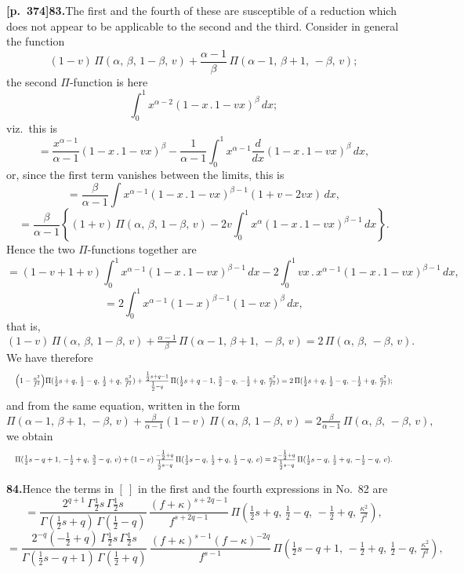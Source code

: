 \documentclass[11pt]{article}
\begin{document}
\bigskip

\noindent\textbf{[p.~374]}\quad \textbf{83.}\quad The first and the fourth of these are susceptible of a reduction which does not appear to be applicable to the second and the third. Consider in general the function
\[
(1-v)\,\Pi(\alpha,\,\beta,\,1-\beta,\,v) + \frac{\alpha-1}{\beta}\,\Pi(\alpha-1,\,\beta+1,\,-\beta,\,v);
\]
the second $\Pi$-function is here
\[
\int_{0}^{1} x^{\alpha-2}(1-x\,.\,1-vx)^{\beta}\,dx;
\]
viz.\ this is
\[
= \frac{x^{\alpha-1}}{\alpha-1}(1-x\,.\,1-vx)^{\beta} - \frac{1}{\alpha-1}\int_{0}^{1} x^{\alpha-1}\frac{d}{dx}(1-x\,.\,1-vx)^{\beta}\,dx,
\]
or, since the first term vanishes between the limits, this is
\[
= \frac{\beta}{\alpha-1}\int x^{\alpha-1}(1-x\,.\,1-vx)^{\beta-1}(1+v-2vx)\,dx,
\]
\[
= \frac{\beta}{\alpha-1}\!\left\{(1+v)\,\Pi(\alpha,\,\beta,\,1-\beta,\,v) - 2v\!\int_{0}^{1} x^{\alpha}(1-x\,.\,1-vx)^{\beta-1}\,dx\right\}.
\]
Hence the two $\Pi$-functions together are
\[
= (1-v+1+v)\!\int_{0}^{1} x^{\alpha-1}(1-x\,.\,1-vx)^{\beta-1}\,dx - 2\!\int_{0}^{1} vx\,.\,x^{\alpha-1}(1-x\,.\,1-vx)^{\beta-1}\,dx,
\]
\[
= 2\!\int_{0}^{1} x^{\alpha-1}(1-x)^{\beta-1}(1-vx)^{\beta}\,dx,
\]
that is,
\[
(1-v)\,\Pi(\alpha,\,\beta,\,1-\beta,\,v) + \tfrac{\alpha-1}{\beta}\,\Pi(\alpha-1,\,\beta+1,\,-\beta,\,v) = 2\,\Pi(\alpha,\,\beta,\,-\beta,\,v).
\]
We have therefore
\[
\resizebox{\textwidth}{!}{$\displaystyle
\left(1-\tfrac{\kappa^{2}}{f^{2}}\right)\!\Pi(\tfrac{1}{2}s+q,\,\tfrac{1}{2}-q,\,\tfrac{1}{2}+q,\,\tfrac{\kappa^{2}}{f^{2}}) + \tfrac{\tfrac{1}{2}s+q-1}{\tfrac{1}{2}-q}\,\Pi(\tfrac{1}{2}s+q-1,\,\tfrac{3}{2}-q,\,-\tfrac{1}{2}+q,\,\tfrac{\kappa^{2}}{f^{2}}) = 2\,\Pi(\tfrac{1}{2}s+q,\,\tfrac{1}{2}-q,\,-\tfrac{1}{2}+q,\,\tfrac{\kappa^{2}}{f^{2}});$}
\]
and from the same equation, written in the form
\[
\Pi(\alpha-1,\,\beta+1,\,-\beta,\,v) + \tfrac{\beta}{\alpha-1}(1-v)\,\Pi(\alpha,\,\beta,\,1-\beta,\,v) = 2\tfrac{\beta}{\alpha-1}\,\Pi(\alpha,\,\beta,\,-\beta,\,v),
\]
we obtain
\[
\resizebox{\textwidth}{!}{$\displaystyle
\Pi(\tfrac{1}{2}s-q+1,\,-\tfrac{1}{2}+q,\,\tfrac{3}{2}-q,\,v) + (1-v)\,\tfrac{-\tfrac{1}{2}+q}{\tfrac{1}{2}s-q}\,\Pi(\tfrac{1}{2}s-q,\,\tfrac{1}{2}+q,\,\tfrac{1}{2}-q,\,v) = 2\tfrac{-\tfrac{1}{2}+q}{\tfrac{1}{2}s-q}\,\Pi(\tfrac{1}{2}s-q,\,\tfrac{1}{2}+q,\,-\tfrac{1}{2}-q,\,v).$}
\]

\bigskip

\noindent\textbf{84.}\quad Hence the terms in $[\ ]$ in the first and the fourth expressions in No.\ 82 are
\[
= \frac{2^{q+1}\,\Gamma\tfrac{1}{2}s\,\Gamma\tfrac{1}{2}s}{\Gamma(\tfrac{1}{2}s+q)\,\Gamma(\tfrac{1}{2}-q)}\,\frac{(f+\kappa)^{s+2q-1}}{f^{s+2q-1}}\,\Pi(\tfrac{1}{2}s+q,\,\tfrac{1}{2}-q,\,-\tfrac{1}{2}+q,\,\tfrac{\kappa^{2}}{f^{2}}),
\]
\[
= \frac{2^{-q}(-\tfrac{1}{2}+q)\,\Gamma\tfrac{1}{2}s\,\Gamma\tfrac{1}{2}s}{\Gamma(\tfrac{1}{2}s-q+1)\,\Gamma(\tfrac{1}{2}+q)}\,\frac{(f+\kappa)^{s-1}(f-\kappa)^{-2q}}{f^{s-1}}\,\Pi(\tfrac{1}{2}s-q+1,\,-\tfrac{1}{2}+q,\,\tfrac{1}{2}-q,\,\tfrac{\kappa^{2}}{f^{2}}),
\]
\end{document}
